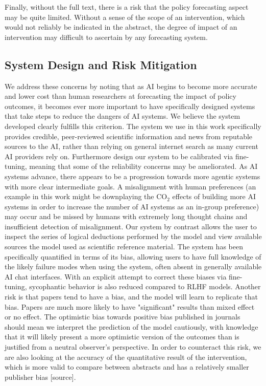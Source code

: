 \documentclass[12pt,a4paper]{article}
\begin{document}
Finally, without the full text, there is a risk that the policy forecasting aspect may be quite limited. Without a sense of the scope of an intervention, which would not reliably be indicated in the abstract, the degree of impact of an intervention may difficult to ascertain by any forecasting system.

\subsection{System Design and Risk Mitigation}
We address these concerns by noting that as AI begins to become more accurate and lower cost than human researchers at forecasting the impact of policy outcomes, it becomes ever more important to have specifically designed systems that take steps to reduce the dangers of AI systems. We believe the system developed clearly fulfills this criterion. The system we use in this work specifically provides credible, peer-reviewed scientific information and news from reputable sources to the AI, rather than relying on general internet search as many current AI providers rely on.  Furthermore design our system to be calibrated via fine-tuning, meaning that some of the reliability concerns may be ameliorated. As AI systems advance, there appears to be a progression towards more agentic systems with more clear intermediate goals. A misalignment with human preferences (an example in this work might be downplaying the CO$_2$ effects of building more AI systems in order to increase the number of AI systems as an in-group preference) may occur and be missed by humans with extremely long thought chains and insufficient detection of misalignment. Our system by contrast allows the user to inspect the series of logical deductions performed by the model and view available sources the model used as scientific reference material. The system has been specifically quantified in terms of its bias, allowing users to have full knowledge of the likely failure modes when using the system, often absent in generally available AI chat interfaces. With an explicit attempt to correct these biases via fine-tuning, sycophantic behavior is also reduced compared to RLHF models.
Another risk is that papers tend to have a bias, and the model will learn to replicate that bias. Papers are much more likely to have "significant" results than mixed effect or no effect. The optimistic bias towards positive bias published in journals should mean we interpret the prediction of the model cautiously, with knowledge that it will likely present a more optimistic version of the outcomes than is justified from a neutral observer's perspective. In order to counteract this risk, we are also looking at the accuracy of the quantitative result of the intervention, which is more valid to compare between abstracts and has a relatively smaller publisher bias [source]. 
\end{document}
